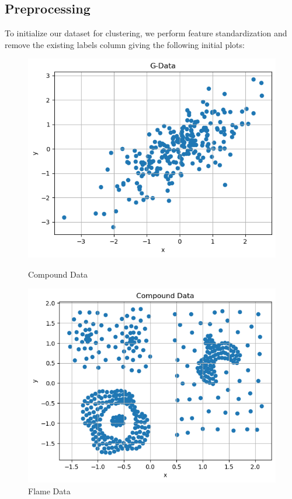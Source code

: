 \documentclass{article}
\begin{document}
\subsection{Preprocessing}
To initialize our dataset for clustering, we perform feature standardization and remove the existing labels
column giving the following initial plots:
\begin{figure}[H]
    \centering
    \begin{minipage}[b]{0.49\textwidth}
        \centering
        \includegraphics[width=\textwidth]{ea.png}
        \caption{Compound Data}
    \end{minipage}
    \hfill
    \begin{minipage}[b]{0.49\textwidth}
        \centering
        \includegraphics[width=\textwidth]{eb.png}
        \caption{Flame Data}
    \end{minipage}
\end{figure}
\end{document}
